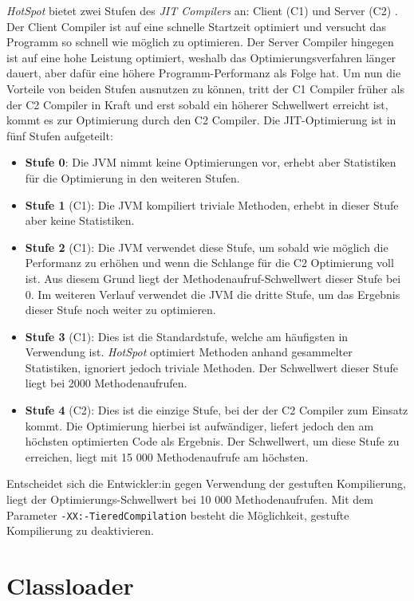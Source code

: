 \textit{HotSpot} bietet zwei Stufen des \textit{JIT Compilers} an: Client (C1) und Server (C2) \parencite{jvmhotspot}. Der Client Compiler ist auf eine schnelle Startzeit optimiert und versucht das Programm so schnell wie möglich zu optimieren. Der Server Compiler hingegen ist auf eine hohe Leistung optimiert, weshalb das Optimierungsverfahren länger dauert, aber dafür eine höhere Programm-Performanz als Folge hat. Um nun die Vorteile von beiden Stufen ausnutzen zu können, tritt der C1 Compiler früher als der C2 Compiler in Kraft und erst sobald ein höherer Schwellwert erreicht ist, kommt es zur Optimierung durch den C2 Compiler. Die JIT-Optimierung ist in fünf Stufen aufgeteilt:
\begin{itemize}
    \item \textbf{Stufe 0}: Die JVM nimmt keine Optimierungen vor, erhebt aber Statistiken für die Optimierung in den weiteren Stufen.
    \item \textbf{Stufe 1} (C1): Die JVM kompiliert triviale Methoden, erhebt in dieser Stufe aber keine Statistiken.
    \item \textbf{Stufe 2} (C1): Die JVM verwendet diese Stufe, um sobald wie möglich die Performanz zu erhöhen und wenn die Schlange für die C2 Optimierung voll ist. Aus diesem Grund liegt der Methodenaufruf-Schwellwert dieser Stufe bei 0. Im weiteren Verlauf verwendet die JVM die dritte Stufe, um das Ergebnis dieser Stufe noch weiter zu optimieren.
    \item \textbf{Stufe 3} (C1): Dies ist die Standardstufe, welche am häufigsten in Verwendung ist. \textit{HotSpot} optimiert Methoden anhand gesammelter Statistiken, ignoriert jedoch triviale Methoden. Der Schwellwert dieser Stufe liegt bei 2000 Methodenaufrufen.
    \item \textbf{Stufe 4} (C2): Dies ist die einzige Stufe, bei der der C2 Compiler zum Einsatz kommt. Die Optimierung hierbei ist aufwändiger, liefert jedoch den am höchsten optimierten Code als Ergebnis. Der Schwellwert, um diese Stufe zu erreichen, liegt mit 15 000 Methodenaufrufe am höchsten.
\end{itemize}

Entscheidet sich die Entwickler:in gegen Verwendung der gestuften Kompilierung, liegt der Optimierungs-Schwellwert bei 10 000 Methodenaufrufen. Mit dem Parameter \texttt{-XX:-TieredCompilation} besteht die Möglichkeit, gestufte Kompilierung zu deaktivieren.

\section{Classloader}

